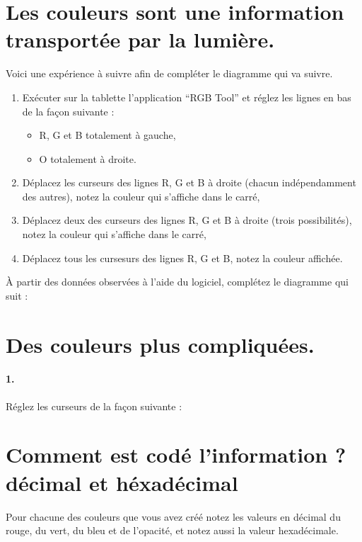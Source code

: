 \documentclass[12pt,a4paper,notitlepage]{article}
\begin{document}
\section{Les couleurs sont une information transportée par la lumière.}
Voici une expérience à suivre afin de compléter le diagramme qui va suivre.
\begin{enumerate}
	\item Exécuter sur la tablette l'application ``RGB Tool'' et réglez les lignes en bas de la façon suivante :
	\begin{itemize}
		\item R, G et B totalement à gauche,
		\item O totalement à droite.
	\end{itemize}
	\item Déplacez les curseurs des lignes R, G et B à droite (chacun indépendamment des autres), notez la couleur qui s'affiche dans le carré,
	\item Déplacez deux des curseurs des lignes R, G et B à droite (trois possibilités), notez la couleur qui s'affiche dans le carré,
	\item Déplacez tous les cursesurs des lignes R, G et B, notez la couleur affichée.
\end{enumerate}
À partir des données observées à l'aide du logiciel, complétez le diagramme qui suit :
\begin{figure}
	\centering
\end{figure}

\section{Des couleurs plus compliquées.}

\paragraph{1.} Réglez les curseurs de la façon suivante :
\begin{itemize}

\end{itemize}

\section{Comment est codé l'information ? décimal et héxadécimal}

Pour chacune des couleurs que vous avez créé notez les valeurs en décimal du rouge, du vert, du bleu et de l'opacité, et notez aussi la valeur hexadécimale.
\end{document}
